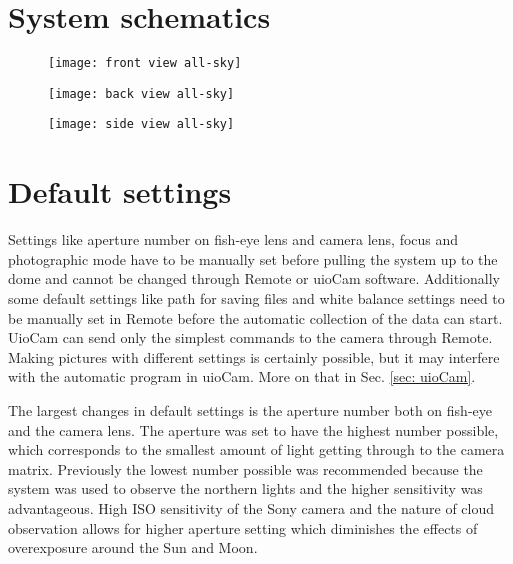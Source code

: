\documentclass[]{book}
\begin{document}
	\pagebreak

	\section{System schematics}

	\begin{figure} [h]
		\centering
		\texttt{[image: front view all-sky]}
		\label{fig: front view}
	\end{figure}

	\pagebreak
	
	\begin{figure} [h]
		\centering
		\texttt{[image: back view all-sky]}
		\label{fig: back view}
	\end{figure}

	\pagebreak
	
	\begin{figure} [h]
		\centering
		\texttt{[image: side view all-sky]}
		\label{fig: side view}
	\end{figure}

	\pagebreak

	\section{Default settings}
	Settings like aperture number on fish-eye lens and camera lens, focus and photographic mode have to be manually set before pulling the system up to the dome and cannot be changed through Remote or uioCam software. Additionally some default settings like path for saving files and white balance settings need to be manually set in Remote before the automatic collection of the data can start. UioCam can send only the simplest commands to the camera through Remote. Making pictures with different settings is certainly possible, but it may interfere with the automatic program in uioCam. More on that in Sec. \ref{sec: uioCam}.
	
	The largest changes in default settings is the aperture number both on fish-eye and the camera lens. The aperture was set to have the highest number possible, which corresponds to the smallest amount of light getting through to the camera matrix. Previously the lowest number possible was recommended because the system was used to observe the northern lights and the higher sensitivity was advantageous. High ISO sensitivity of the Sony camera and the nature of cloud observation allows for higher aperture setting which diminishes the effects of overexposure around the Sun and Moon.
	
\end{document}
